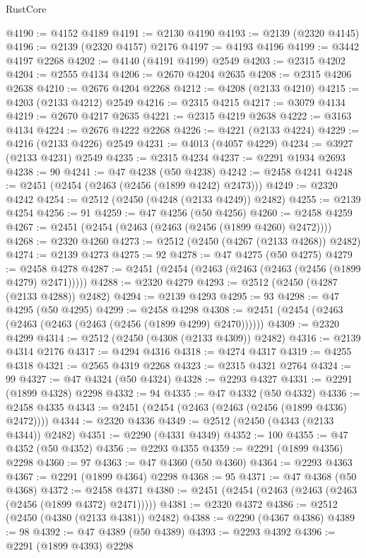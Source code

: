 \begin{lexlean}{RustCore}
\begin{coremodule}
@4190 := @4152 @4189
@4191 := @2130 @4190
@4193 := @2139 (@2320 @4145)
@4196 := @2139 (@2320 @4157) @2176
@4197 := @4193 @4196
@4199 := @3442 @4197 @2268
@4202 := @4140 (@4191 @4199) @2549
@4203 := @2315 @4202
@4204 := @2555 @4134
@4206 := @2670 @4204 @2635
@4208 := @2315 @4206 @2638
@4210 := @2676 @4204 @2268
@4212 := @4208 (@2133 @4210)
@4215 := @4203 (@2133 @4212) @2549
@4216 := @2315 @4215
@4217 := @3079 @4134
@4219 := @2670 @4217 @2635
@4221 := @2315 @4219 @2638
@4222 := @3163 @4134
@4224 := @2676 @4222 @2268
@4226 := @4221 (@2133 @4224)
@4229 := @4216 (@2133 @4226) @2549
@4231 := @4013 (@4057 @4229)
@4234 := @3927 (@2133 @4231) @2549
@4235 := @2315 @4234
@4237 := @2291 @1934 @2693
@4238 := 90
@4241 := @47 @4238 (@50 @4238)
@4242 := @2458 @4241
@4248 := @2451 (@2454 (@2463 (@2456 (@1899 @4242) @2473)))
@4249 := @2320 @4242
@4254 := @2512 (@2450 (@4248 (@2133 @4249)) @2482)
@4255 := @2139 @4254
@4256 := 91
@4259 := @47 @4256 (@50 @4256)
@4260 := @2458 @4259
@4267 := @2451 (@2454 (@2463 (@2463 (@2456 (@1899 @4260) @2472))))
@4268 := @2320 @4260
@4273 := @2512 (@2450 (@4267 (@2133 @4268)) @2482)
@4274 := @2139 @4273
@4275 := 92
@4278 := @47 @4275 (@50 @4275)
@4279 := @2458 @4278
@4287 := @2451 (@2454 (@2463 (@2463 (@2463 (@2456 (@1899 @4279) @2471)))))
@4288 := @2320 @4279
@4293 := @2512 (@2450 (@4287 (@2133 @4288)) @2482)
@4294 := @2139 @4293
@4295 := 93
@4298 := @47 @4295 (@50 @4295)
@4299 := @2458 @4298
@4308 := @2451 (@2454 (@2463 (@2463 (@2463 (@2463 (@2456 (@1899 @4299) @2470))))))
@4309 := @2320 @4299
@4314 := @2512 (@2450 (@4308 (@2133 @4309)) @2482)
@4316 := @2139 @4314 @2176
@4317 := @4294 @4316
@4318 := @4274 @4317
@4319 := @4255 @4318
@4321 := @2565 @4319 @2268
@4323 := @2315 @4321 @2764
@4324 := 99
@4327 := @47 @4324 (@50 @4324)
@4328 := @2293 @4327
@4331 := @2291 (@1899 @4328) @2298
@4332 := 94
@4335 := @47 @4332 (@50 @4332)
@4336 := @2458 @4335
@4343 := @2451 (@2454 (@2463 (@2463 (@2456 (@1899 @4336) @2472))))
@4344 := @2320 @4336
@4349 := @2512 (@2450 (@4343 (@2133 @4344)) @2482)
@4351 := @2290 (@4331 @4349)
@4352 := 100
@4355 := @47 @4352 (@50 @4352)
@4356 := @2293 @4355
@4359 := @2291 (@1899 @4356) @2298
@4360 := 97
@4363 := @47 @4360 (@50 @4360)
@4364 := @2293 @4363
@4367 := @2291 (@1899 @4364) @2298
@4368 := 95
@4371 := @47 @4368 (@50 @4368)
@4372 := @2458 @4371
@4380 := @2451 (@2454 (@2463 (@2463 (@2463 (@2456 (@1899 @4372) @2471)))))
@4381 := @2320 @4372
@4386 := @2512 (@2450 (@4380 (@2133 @4381)) @2482)
@4388 := @2290 (@4367 @4386)
@4389 := 98
@4392 := @47 @4389 (@50 @4389)
@4393 := @2293 @4392
@4396 := @2291 (@1899 @4393) @2298

\end{coremodule}
\end{lexlean}
